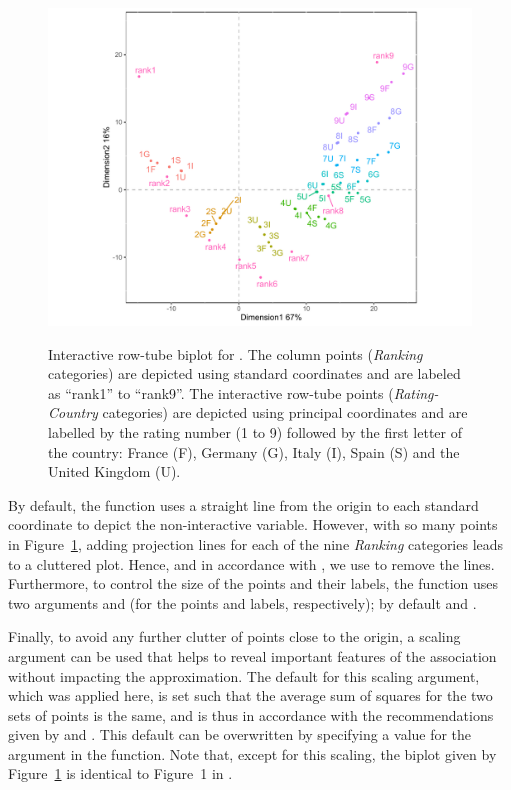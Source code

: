 \begin{figure}[b!]
	\begin{center}
		{\includegraphics*[width=1.1\textwidth]{ratrank.pdf}}
		\caption{\label{fig_ratrank} Interactive row-tube biplot for . The column points ({\it Ranking} categories) are depicted using standard coordinates and are labeled as ``rank1'' to ``rank9''. The interactive row-tube points ({\it Rating-Country} categories) are depicted using principal coordinates and are labelled by the rating number (1 to 9) followed by the first letter of the country: France (F), Germany (G), Italy (I), Spain (S) and the United Kingdom (U).}
	\end{center}
\end{figure}

By default, the  function uses a straight line  from the origin to each standard coordinate to depict the non-interactive variable.
However, with so many points in Figure~\ref{fig_ratrank}, adding  projection lines for each of the nine {\it Ranking} categories leads to a cluttered plot. Hence, and in accordance with \cite{vel07}, we use  to remove the lines. 
Furthermore, to control  the size of the points and their labels,  the  function uses two arguments  and  (for the points and labels, respectively); by default  and . 

Finally, to avoid any further clutter of points close to the origin, a scaling argument can be used that helps to reveal important features of the association without impacting the approximation. The default for this scaling argument, which was applied here, is set such that the average sum of squares for the two sets of points is the same, and is thus in accordance with the recommendations given by \cite{goweretal2010} and \cite{vel17}. 
This default can be overwritten by specifying a value for the  argument in the  function. Note that, except for this scaling, the biplot given by Figure~\ref{fig_ratrank} is identical to Figure~1 in \cite{vel07}.


